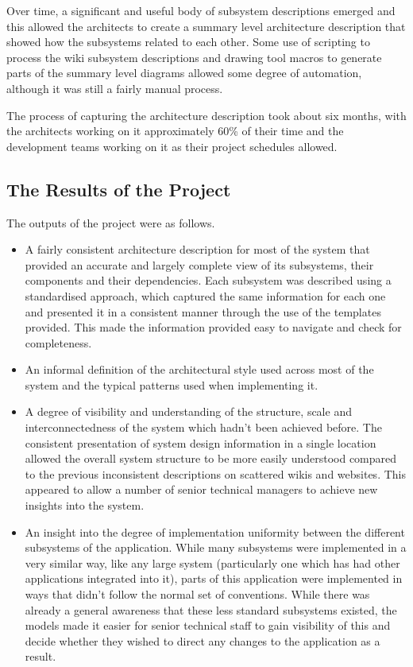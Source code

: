   Over time, a significant and useful body of subsystem descriptions emerged and this allowed the architects to create a summary level architecture description that showed how the subsystems related to each other.  Some use of scripting to process the wiki subsystem descriptions and drawing tool macros to generate parts of the summary level diagrams allowed some degree of automation, although it was still a fairly manual process.

   The process of capturing the architecture description took about six months, with the architects working on it approximately 60\% of their time and the development teams working on it as their project schedules allowed.

\subsection{The Results of the Project}

  The outputs of the project were as follows.

\begin{itemize}
\item A fairly consistent architecture description for most of the system that provided an accurate and largely complete view of its subsystems, their components and their dependencies.  Each subsystem was described using a standardised approach, which captured the same information for each one and presented it in a consistent manner through the use of the templates provided.  This made the information provided easy to navigate and check for completeness.

\item An informal definition of the architectural style used across most of the system and the typical patterns used when implementing it.

\item A degree of visibility and understanding of the structure, scale and interconnectedness of the system which hadn't been achieved before.  The consistent presentation of system design information in a single location allowed the overall system structure to be more easily understood compared to the previous inconsistent descriptions on scattered wikis and websites.  This appeared to allow a number of senior technical managers to achieve new insights into the system.

\item An insight into the degree of implementation uniformity between the different subsystems of the application.  While many subsystems were implemented in a very similar way, like any large system (particularly one which has had other applications integrated into it), parts of this application were implemented in ways that didn't follow the normal set of conventions.  While there was already a general awareness that these less standard subsystems existed, the models made it easier for senior technical staff to gain visibility of this and decide whether they wished to direct any changes to the application as a result.

\end{itemize}

